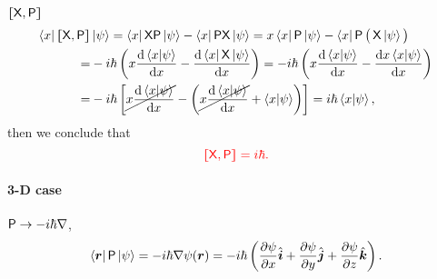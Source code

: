 \documentclass{article}
\def\d{{\rm d}}
\newcommand{\ko}[1]{\hspace{-#1 pt}}%
\newcommand{\su}[1]{\vspace{-#1 pt}}%
\newcommand{\ds}[2]{\frac{\d #1}{\d #2}}%
\newcommand{\pd}[2]{\frac{\partial #1}{\partial #2}}%
\newcommand{\bra}[1]{\left\langle #1\right\vert}
\newcommand{\ket}[1]{\left\vert #1\right\rangle}
\newcommand{\brkt}[2]{\left\langle #1\middle\vert#2\right\rangle}
\newcommand{\kh}[1]{\left(#1\right)}
\newcommand{\cmm}[1]{\lfloor\ko{4.45}\lceil #1\rceil\ko{4.45}\rfloor}%
\newcommand{\spark}[1]{\textcolor{red}{#1}}
\begin{document}
\begin{example}{$\cmm{\sX,\sP}$}{}\su{12}
	\begin{align*}
		\bra x\cmm{\sX,\sP} & \ket\psi=\bra x\sX\sP\ket\psi-\bra x\sP\sX\ket\psi
		=x\bra x\sP\ket\psi-\bra x\sP\,\big(\,\sX\ket\psi\big)                                                                     \\
		=                   & -i\hbar\left(x\ds{\brkt x\psi}x-\ds{\bra x\sX\ket\psi}x\right)
		=-i\hbar\left(x\ds{\brkt x\psi}x-\ds{x\brkt x\psi}x\right)                                                                 \\
		=                   & -i\hbar\left[\cancel{x\ds{\brkt x\psi}x}-\left(\cancel{x\ds{\brkt x\psi}x}+\brkt x\psi\right)\right]
		=i\hbar\brkt x\psi,
	\end{align*}
	then we conclude that
	$$\spark{\cmm{\sX,\sP}=i\hbar.}$$
\end{example}
\paragraph{3-D case}%
$\mathsf P\to-i\hbar\nabla$,
$$\bra{\bm r}\sP\ket\psi=-i\hbar\nabla\psi(\bm r)=-i\hbar\kh{\pd\psi{x}\hat{\bm i}+\pd\psi{y}\hat{\bm j}+\pd\psi{z}\hat{\bm k}}.$$
\end{document}
